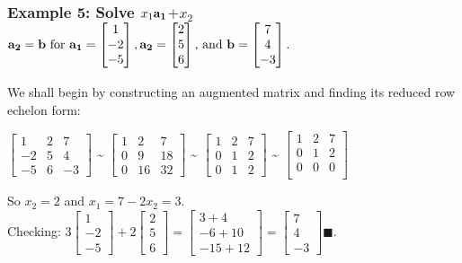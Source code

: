 \documentclass[12pt]{article} %
\begin{document}
\subsubsection{Example 5: Solve $x_1\bf{a_1}$$ + x_2 $$\bf{a_2} = \bf{b} \text{ for } \bf{a_1} = \begin{bmatrix}1\\-2\\-5\end{bmatrix}, \bf{a_2} = \begin{bmatrix}2\\5\\6\end{bmatrix}\text{, and  }\bf{b} = \begin{bmatrix}7\\4\\-3\end{bmatrix}.$}
We shall begin by constructing an augmented matrix and finding its reduced row echelon form:
\begin{center}
	$\begin{bmatrix}
		1 & 2 & 7\\
		-2 & 5 & 4\\
		-5 & 6 & -3
	\end{bmatrix}$
	\textasciitilde
	$\begin{bmatrix}
		1 & 2 & 7\\
		0 & 9 & 18\\
		0 & 16 & 32
	\end{bmatrix}$
	\textasciitilde
	$\begin{bmatrix}
		1 & 2 & 7\\
		0 & 1 & 2\\
		0 & 1 & 2
	\end{bmatrix}$
	\textasciitilde
	$\begin{bmatrix}
		1 & 2 & 7\\
		0 & 1 & 2\\
		0 & 0 & 0\\
	\end{bmatrix}$
\end{center}
So $x_2 = 2$ and $x_1 = 7 - 2x_2 = 3$.\\

Checking: $3\begin{bmatrix}1\\-2\\-5\end{bmatrix} + 2\begin{bmatrix}2\\5\\6\end{bmatrix} = \begin{bmatrix}3 + 4\\-6 + 10\\-15 + 12\end{bmatrix} = \begin{bmatrix}7\\4\\-3\end{bmatrix} \blacksquare.$\\
\end{document}
